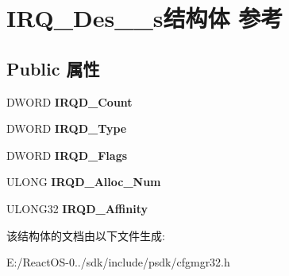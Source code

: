 \hypertarget{struct_i_r_q___des__32__s}{}\section{I\+R\+Q\+\_\+\+Des\+\_\+\_\+s结构体 参考}
\label{struct_i_r_q___des__32__s}
\subsection*{Public 属性}
\begin{DoxyCompactItemize}
\item 
\mbox{\label{struct_i_r_q___des__32__s_a9736208181ef21c24fb2971ce1164328}} 
D\+W\+O\+RD {\bfseries I\+R\+Q\+D\+\_\+\+Count}
\item 
\mbox{\label{struct_i_r_q___des__32__s_a6d7000366e9fdfc97c003640a677aaed}} 
D\+W\+O\+RD {\bfseries I\+R\+Q\+D\+\_\+\+Type}
\item 
\mbox{\label{struct_i_r_q___des__32__s_a462f0ee218824a364f7c8fffe35ea091}} 
D\+W\+O\+RD {\bfseries I\+R\+Q\+D\+\_\+\+Flags}
\item 
\mbox{\label{struct_i_r_q___des__32__s_a45eb6b397f34d2c41772e4e265873965}} 
U\+L\+O\+NG {\bfseries I\+R\+Q\+D\+\_\+\+Alloc\+\_\+\+Num}
\item 
\mbox{\label{struct_i_r_q___des__32__s_a143d59e60da1b288f291792ca16312b3}} 
U\+L\+O\+N\+G32 {\bfseries I\+R\+Q\+D\+\_\+\+Affinity}
\end{DoxyCompactItemize}


该结构体的文档由以下文件生成\+:\begin{DoxyCompactItemize}
\item 
E\+:/\+React\+O\+S-\/0../sdk/include/psdk/cfgmgr32.\+h\end{DoxyCompactItemize}
